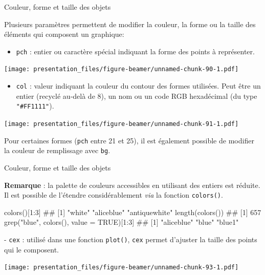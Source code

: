 \documentclass[12pt,handout,ignorenonframetext,]{beamer}
\newenvironment{Shaded}{}{}
\newcommand{\KeywordTok}[1]{\textcolor[rgb]{0.00,0.00,1.00}{#1}}
\newcommand{\DataTypeTok}[1]{#1}
\newcommand{\DecValTok}[1]{#1}
\newcommand{\StringTok}[1]{\textcolor[rgb]{0.00,0.50,0.50}{#1}}
\newcommand{\OtherTok}[1]{\textcolor[rgb]{1.00,0.25,0.00}{#1}}
\newcommand{\OperatorTok}[1]{#1}
\newcommand{\NormalTok}[1]{#1}
\providecommand{\tightlist}{%
  \setlength{\itemsep}{0pt}\setlength{\parskip}{0pt}}
\renewenvironment{Shaded}{\begin{snugshade}}{\end{snugshade}}
\begin{document}
\begin{frame}[fragile]{Couleur, forme et taille des objets}

Plusieurs paramètres permettent de modifier la couleur, la forme ou la
taille des éléments qui composent un graphique:

\begin{itemize}
\tightlist
\item
  \pause \texttt{pch} : entier ou caractère spécial indiquant la forme
  des points à représenter.
\end{itemize}

\texttt{[image: presentation\_files/figure-beamer/unnamed-chunk-90-1.pdf]}

\begin{itemize}
\tightlist
\item
  \pause \texttt{col} : valeur indiquant la couleur du contour des
  formes utilisées. Peut être un entier (recyclé au-delà de 8), un nom
  ou un code RGB hexadécimal (du type \texttt{"\#FF1111"}). \small  
\end{itemize}

\texttt{[image: presentation\_files/figure-beamer/unnamed-chunk-91-1.pdf]}

Pour certaines formes (\texttt{pch} entre 21 et 25), il est également
possible de modifier la couleur de remplissage avec \texttt{bg}.

\end{frame}

\begin{frame}[fragile]{Couleur, forme et taille des objets}

\textbf{Remarque} : la palette de couleurs accessibles en utilisant des
entiers est réduite. Il est possible de l'étendre considérablement
\emph{via} la fonction \texttt{colors()}.

\small

\begin{Shaded}
\begin{Highlighting}[]
\KeywordTok{colors}\NormalTok{()[}\DecValTok{1}\OperatorTok{:}\DecValTok{3}\NormalTok{]}
\NormalTok{  ## [1] "white"        "aliceblue"    "antiquewhite"}
\KeywordTok{length}\NormalTok{(}\KeywordTok{colors}\NormalTok{())}
\NormalTok{  ## [1] 657}
\KeywordTok{grep}\NormalTok{(}\StringTok{"blue"}\NormalTok{, }\KeywordTok{colors}\NormalTok{(), }\DataTypeTok{value =} \OtherTok{TRUE}\NormalTok{)[}\DecValTok{1}\OperatorTok{:}\DecValTok{3}\NormalTok{]}
\NormalTok{  ## [1] "aliceblue" "blue"      "blue1"}
\end{Highlighting}
\end{Shaded}

\pause \normalsize
- \texttt{cex} : utilisé dans une fonction \texttt{plot()}, \texttt{cex}
permet d'ajuster la taille des points qui le composent.

\texttt{[image: presentation\_files/figure-beamer/unnamed-chunk-93-1.pdf]}

\end{frame}
\end{document}
